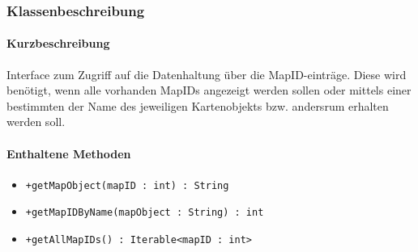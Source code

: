 \subsubsection*{Klassenbeschreibung}%
\paragraph*{Kurzbeschreibung}
Interface zum Zugriff auf die Datenhaltung über die MapID-einträge. Diese wird benötigt, wenn alle vorhanden MapIDs angezeigt werden sollen oder
mittels einer bestimmten der Name des jeweiligen Kartenobjekts bzw. andersrum erhalten werden soll.

\paragraph*{Enthaltene Methoden}
\begin{itemize}
    \item \texttt{+getMapObject(mapID : int) : String}
    \item \texttt{+getMapIDByName(mapObject : String) : int}
    \item \texttt{+getAllMapIDs() : Iterable<mapID : int>}
\end{itemize}
